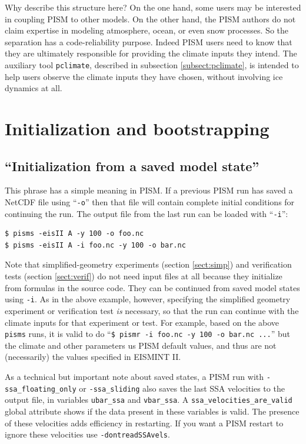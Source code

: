\documentclass[titlepage,letterpaper,final]{scrartcl}
\begin{document}
Why describe this structure here? On the one hand, some users may be interested
in coupling PISM to other models. On the other hand, the PISM authors do not
claim expertise in modeling atmosphere, ocean, or even snow processes.   So the
separation has a code-reliability purpose. Indeed PISM users need to know that
they are ultimately responsible for providing the climate inputs they intend.
The auxiliary tool \texttt{pclimate}, described in subsection
\ref{subsect:pclimate}, is intended to help users observe the climate inputs
they have chosen, without involving ice dynamics at all.

\clearpage
\newpage
\section{Initialization and bootstrapping}\label{sect:boot}  

\subsection{``Initialization from a saved model state''}  This phrase has a simple meaning in PISM.  If a previous PISM run has saved a NetCDF file using ``\texttt{-o}'' then that file will contain complete initial conditions for continuing the run.  The output file from the last run can be loaded with ``\texttt{-i}'':

\begin{verbatim}
$ pisms -eisII A -y 100 -o foo.nc
$ pisms -eisII A -i foo.nc -y 100 -o bar.nc
\end{verbatim}
\smallskip

Note that simplified-geometry experiments (section \ref{sect:simp}) and verification tests (section \ref{sect:verif}) do not need input files at all because they initialize from formulas in the source code.  They can be continued from saved model states using \texttt{-i}.  As in the above example, however, specifying the simplified geometry experiment or verification test \emph{is} necessary, so that the run can continue with the climate inputs for that experiment or test.  For example, based on the above \texttt{pisms} runs, it is valid to do ``\texttt{\$ pismr -i foo.nc -y 100 -o bar.nc ...}'' but the climate and other parameters us PISM default values, and thus are not (necessarily) the values specified in EISMINT II.

As a technical but important note about saved states, a PISM run with \texttt{-ssa_floating_only} or \texttt{-ssa_sliding}
also saves the last SSA velocities to the output file, in variables 
\texttt{ubar_ssa} and \texttt{vbar_ssa}.  A \texttt{ssa_velocities_are_valid} global
attribute shows if the data present in these variables is valid.  The presence
of these velocities adds efficiency in restarting.  If you want a PISM restart to
ignore these velocities use \texttt{-dontreadSSAvels}.
\end{document}

